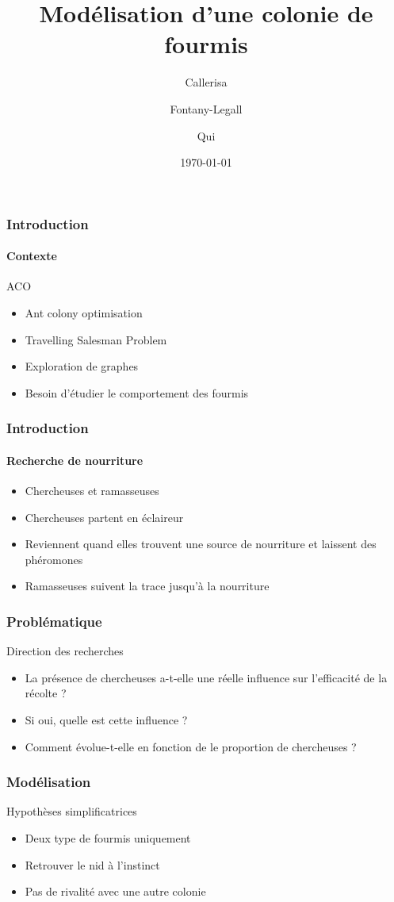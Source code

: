 \documentclass[11pt]{beamer}
\author{Callerisa \and Fontany-Legall \and Qui}
\title{Modélisation d'une colonie de fourmis}
\institute{Université de Nice}
\date{\today}
\begin{document}
\begin{frame}

\titlepage
\end{frame}

\begin{frame}
\tableofcontents
\end{frame}

\begin{frame}
\frametitle{Introduction}
\framesubtitle{Contexte}
\begin{block}{ACO}
\begin{itemize}
\item Ant colony optimisation
\item Travelling Salesman Problem
\item Exploration de graphes
\item Besoin d'étudier le comportement des fourmis
\end{itemize}
\end{block}
\end{frame}

\begin{frame}
\frametitle{Introduction}
\framesubtitle{Recherche de nourriture}
\begin{itemize}
\item Chercheuses et ramasseuses
\item Chercheuses partent en éclaireur
\item Reviennent quand elles trouvent une source de nourriture et laissent des phéromones
\item Ramasseuses suivent la trace jusqu'à la nourriture 
\end{itemize}
\end{frame}

\begin{frame}
\frametitle{Problématique}
\begin{block}{Direction des recherches}
\begin{itemize}
\item La présence de chercheuses a-t-elle une réelle influence sur l'efficacité de la récolte ?
\item Si oui, quelle est cette influence ?
\item Comment évolue-t-elle en fonction de le proportion de chercheuses ? 
\end{itemize}
\end{block}
\end{frame}

\begin{frame}
\frametitle{Modélisation}
\begin{block}{Hypothèses simplificatrices}
\begin{itemize}
\item Deux type de fourmis uniquement
\item Retrouver le nid à l'instinct
\item Pas de rivalité avec une autre colonie
\end{itemize}
\end{block}
\end{frame}
\end{document}
